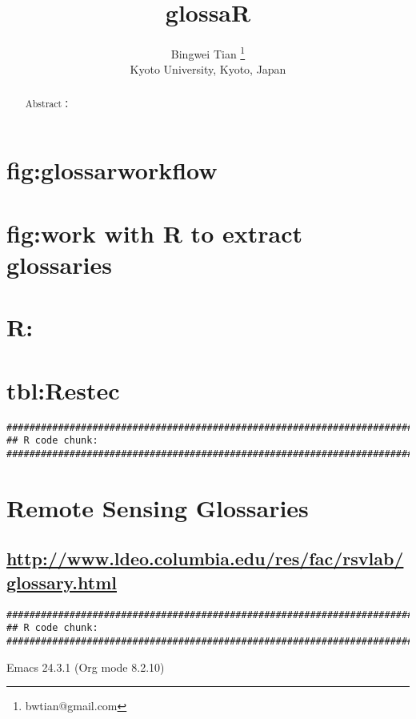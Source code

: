 \documentclass[a4paper,times,12pt,listings-bw,microtype]{article}
\author{Bingwei Tian  \thanks{bwtian@gmail.com}\\  \small{Kyoto University, Kyoto, Japan}}
\date{}
\title{glossaR}
\begin{document}
\maketitle
\setcounter{tocdepth}{2}
\tableofcontents

\label{sec-1}
\begin{abstract}
Abstract：
\end{abstract}


\section{fig:glossarworkflow}
\label{sec-2}
\section{fig:work with R to extract glossaries}
\label{sec-3}
\section{R:}
\label{sec-4}

\section{tbl:Restec}
\label{sec-5}
\begin{verbatim}
###############################################################################
## R code chunk:
###############################################################################
\end{verbatim}

\section{Remote Sensing Glossaries}
\label{sec-6}

\subsection{\url{http://www.ldeo.columbia.edu/res/fac/rsvlab/glossary.html}}
\label{sec-6-1}
\begin{verbatim}
###############################################################################
## R code chunk:
###############################################################################
\end{verbatim}
Emacs 24.3.1 (Org mode 8.2.10)
\end{document}
